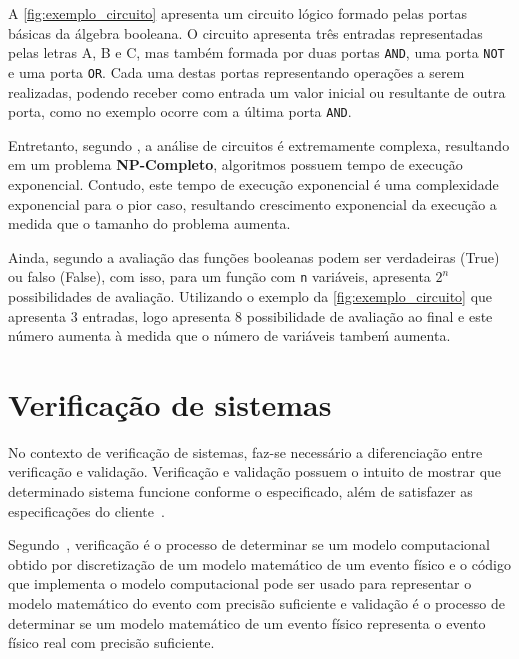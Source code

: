 A \autoref{fig:exemplo_circuito} apresenta um circuito lógico formado pelas portas básicas da álgebra booleana. O circuito apresenta três entradas representadas pelas letras A, B e C, mas também formada por duas portas \texttt{AND}, uma porta \texttt{NOT} e uma porta \texttt{OR}. Cada uma destas portas representando operações a serem realizadas, podendo receber como entrada um valor inicial ou resultante de outra porta, como no exemplo ocorre com a última porta \texttt{AND}.

\par
Entretanto, segundo , a análise de circuitos é extremamente complexa, resultando em um problema \textbf{NP-Completo}, algoritmos possuem tempo de execução exponencial. Contudo, este tempo de execução exponencial é uma complexidade exponencial para o pior caso, resultando crescimento exponencial da execução a medida que o tamanho do problema aumenta.

\par
Ainda, segundo  a avaliação das funções booleanas podem ser verdadeiras (True) ou falso (False), com isso, para um função com \texttt{n} variáveis, apresenta $2^{n}$ possibilidades de avaliação. Utilizando o exemplo da \autoref{fig:exemplo_circuito} que apresenta $3$ entradas, logo apresenta 8 possibilidade de avaliação ao final e este número aumenta à medida que o número de variáveis tambeḿ aumenta.

\section{Verificação de sistemas}
 No contexto de verificação de sistemas, faz-se necessário a diferenciação entre verificação e validação. Verificação e validação possuem o intuito de mostrar que determinado sistema funcione conforme o especificado, além de satisfazer as especificações do cliente~\cite{sommerville2011engenharia}. 

\par
Segundo~, verificação é o processo de determinar se um modelo computacional obtido por discretização de um modelo matemático de um evento físico e o código que implementa o modelo computacional pode ser usado para representar o modelo matemático do evento com precisão suficiente e validação é o processo de determinar se um modelo matemático de um evento físico representa o evento físico real com precisão suficiente.

